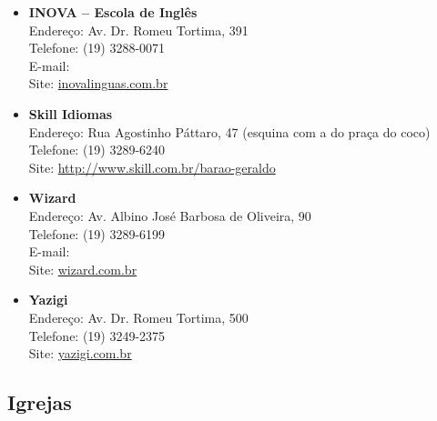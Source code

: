 \begin{itemize}
    \item   \textbf{INOVA -- Escola de Inglês}
        \\Endereço: Av. Dr. Romeu Tortima, 391
        \\Telefone: (19) 3288-0071
        \\E-mail: 
        \\Site: \url{inovalinguas.com.br}

    \item   \textbf{Skill Idiomas}
        \\Endereço: Rua Agostinho Páttaro, 47 (esquina com a do praça do coco)
        \\Telefone: (19) 3289-6240
        \\Site: \url{http://www.skill.com.br/barao-geraldo}

    \item   \textbf{Wizard}
        \\Endereço: Av. Albino José Barbosa de Oliveira, 90
        \\Telefone: (19) 3289-6199
        \\E-mail: 
        \\Site: \url{wizard.com.br}

    \item   \textbf{Yazigi}
        \\Endereço: Av. Dr. Romeu Tortima, 500
        \\Telefone: (19) 3249-2375
        \\Site: \url{yazigi.com.br}
\end{itemize}

\subsection{Igrejas}

